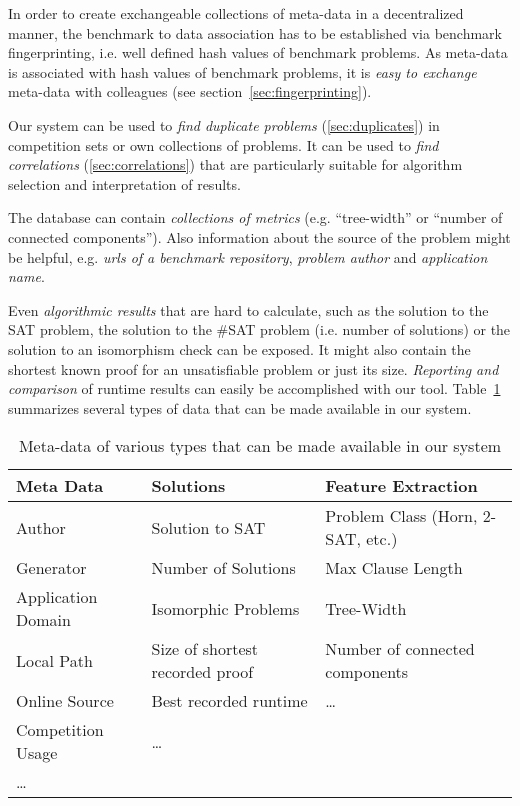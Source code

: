 \documentclass{easychair}
\begin{document}
In order to create exchangeable collections of meta-data in a decentralized manner, 
the benchmark to data association has to be established via benchmark fingerprinting, i.e. well defined hash values of benchmark problems. 
As meta-data is associated with hash values of benchmark problems, it is \emph{easy to exchange} meta-data with colleagues (see section~\ref{sec:fingerprinting}). 

Our system can be used to \emph{find duplicate problems} (\ref{sec:duplicates}) in competition sets or own collections of problems. It can be used to \emph{find correlations} (\ref{sec:correlations}) that are particularly suitable for algorithm selection and interpretation of results. 

The database can contain \emph{collections of metrics} (e.g. ``tree-width'' or ``number of connected components''). Also information about the source of the problem might be helpful, e.g. \emph{urls of a benchmark repository}, \emph{problem author} and \emph{application name}. 

Even \emph{algorithmic results} that are hard to calculate, such as the solution to the SAT problem, the solution to the \#SAT problem (i.e. number of solutions) or the solution to an isomorphism check can be exposed. It might also contain the shortest known proof for an unsatisfiable problem or just its size. \emph{Reporting and comparison} of runtime results can easily be accomplished with our tool.
Table~\ref{tab:datatypes} summarizes several types of data that can be made available in our system.

\begin{table}[t]

\begin{tabular}{|l|l|l|}
  \hline
  \textbf{Meta Data} 	& \textbf{Solutions} 				& \textbf{Feature Extraction} \\
  \hline
  Author 				& Solution to SAT				 	& Problem Class (Horn, 2-SAT, etc.) \\
  Generator 			& Number of Solutions		 		& Max Clause Length\\
  Application Domain 	& Isomorphic Problems 				& Tree-Width\\
  Local Path 			& Size of shortest recorded proof   & Number of connected components \\
  Online Source 		& Best recorded runtime 			& \dots \\
  Competition Usage 	& \dots & \\
  \dots & & \\
  \hline
\end{tabular}
\caption{Meta-data of various types that can be made available in our system}
\label{tab:datatypes}
\end{table}
\end{document}
